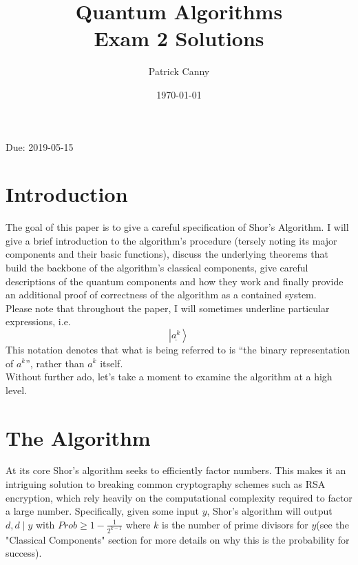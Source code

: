 \documentclass{exam} %
\theoremstyle{plain}
\theoremstyle{definition}
\theoremstyle{remark}
\numberwithin{equation}{section}  %
\newcommand{\ket}[1]{ \left| #1 \right> }
\begin{document}
  
\printanswers
\title{Quantum Algorithms \\ Exam 2 Solutions}
\author{Patrick Canny}
\date{\today}
\maketitle
\vspace{-0.7em} \begin{center} \sc
  Due: 2019-05-15
\end{center} \vspace{2em}
\section{Introduction}

The goal of this paper is to give a careful specification of Shor's Algorithm. 
I will give a brief introduction to the algorithm's procedure (tersely noting
its major components and their basic functions), discuss the underlying theorems
that build the backbone of the algorithm's classical components, give careful
descriptions of the quantum components and how they work and finally provide 
an additional proof of correctness of the algorithm as a contained system.\\

Please note that throughout the paper, I will sometimes underline particular
expressions, i.e.
\[
  \ket{\underline{a^k}}
\]
This notation denotes that what is being referred to is ``the binary
representation of $a^k$'', rather than $a^k$ itself.\\

Without further ado, let's take a moment to examine the algorithm at a high level.
\section{The Algorithm}

At its core Shor's algorithm seeks to efficiently factor numbers. This makes it
an intriguing solution to breaking common cryptography schemes such as RSA 
encryption, which rely heavily on the computational complexity required to
factor a large number. Specifically, given some input $y$, Shor's algorithm 
will output $d, d \mid y$ with $Prob \geq 1 - \frac{1}{2^{k-1}}$ where $k$
is the number of prime divisors for $y$(see the "Classical Components" section
for more details on why this is the probability for success).\\
\end{document}
